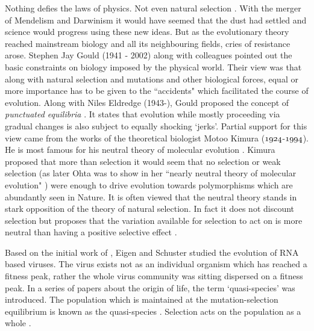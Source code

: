 \documentclass[oneside,11pt,a4paper]{book}
\begin{document}
Nothing defies the laws of physics.
Not even natural selection \citep{mitchell:2009bo}.
With the merger of Mendelism and Darwinism it would have seemed that the dust had settled and science would progress using these new ideas.
But as the evolutionary theory reached mainstream biology and all its neighbouring fields, cries of resistance arose.
Stephen Jay Gould (1941 - 2002) along with colleagues pointed out the basic constraints on biology imposed by the physical world.
Their view was that along with natural selection and mutations and other biological forces, equal or more importance has to be given to the ``accidents" which facilitated the course of evolution.
Along with Niles Eldredge (1943-), Gould proposed the concept of \textit{punctuated equilibria} \citep{eldredge:1985aa,bak:1993yo}.
It states that evolution while mostly proceeding via gradual changes is also subject to equally shocking `jerks'.
Partial support for this view came from the works of the theoretical biologist Motoo Kimura ($\oldstylenums{1924}$-$\oldstylenums{1994}$).
He is most famous for his neutral theory of molecular evolution \citep{kimura:1968aa}.
Kimura proposed that more than selection it would seem that no selection or weak selection (as later Ohta was to show in her ``nearly neutral theory of molecular evolution" \citep{ohta:1996aa}) were enough to drive evolution towards polymorphisms which are abundantly seen in Nature.
It is often viewed that the neutral theory stands in stark opposition of the theory of natural selection.
In fact it does not discount selection but proposes that the variation available for selection to act on is more neutral than having a positive selective effect \citep{ridley:1996bo}.


Based on the initial work of \citet{eigen:1971qe}, Eigen and Schuster studied the evolution of RNA based viruses.
The virus exists not as an individual organism which has reached a fitness peak,
rather the whole virus community was sitting dispersed on a fitness peak.
In a series of papers \citep{eigen:1977aa,eigen:1978aa,eigen:1978bb} about the origin of life, the term `quasi-species' was introduced.
The population which is maintained at the mutation-selection equilibrium is known as the quasi-species  \citep{nowak:1992aa}.
Selection acts on the population as a whole \citep{eigen:1989aa}.
\end{document}
